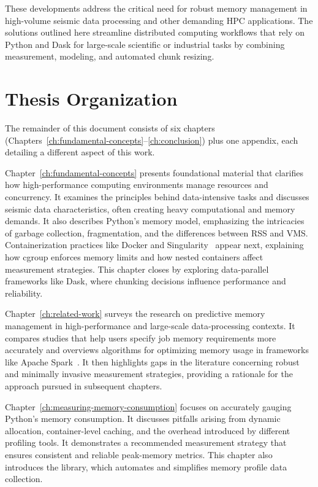 These developments address the critical need for robust memory management in high-volume seismic data processing and other demanding \ac{HPC} applications.
The solutions outlined here streamline distributed computing workflows that rely on Python and Dask for large-scale scientific or industrial tasks by combining measurement, modeling, and automated chunk resizing.


\section{Thesis Organization}
\label{sec:thesis-organization}

The remainder of this document consists of six chapters (Chapters~\ref{ch:fundamental-concepts}–\ref{ch:conclusion}) plus one appendix, each detailing a different aspect of this work.

Chapter~\ref{ch:fundamental-concepts} presents foundational material that clarifies how high-performance computing environments manage resources and concurrency.
It examines the principles behind data-intensive tasks and discusses seismic data characteristics, often creating heavy computational and memory demands.
It also describes Python's memory model, emphasizing the intricacies of garbage collection, fragmentation, and the differences between \ac{RSS} and \ac{VMS}.
Containerization practices like Docker and Singularity~\cite{singularity} appear next, explaining how \ac{cgroup} enforces memory limits and how nested containers affect measurement strategies.
This chapter closes by exploring data-parallel frameworks like Dask, where chunking decisions influence performance and reliability.

Chapter~\ref{ch:related-work} surveys the research on predictive memory management in high-performance and large-scale data-processing contexts.
It compares studies that help users specify job memory requirements more accurately and overviews algorithms for optimizing memory usage in frameworks like Apache Spark~\cite{zaharia2010spark}.
It then highlights gaps in the literature concerning robust and minimally invasive measurement strategies, providing a rationale for the approach pursued in subsequent chapters.

Chapter~\ref{ch:measuring-memory-consumption} focuses on accurately gauging Python's memory consumption.
It discusses pitfalls arising from dynamic allocation, container-level caching, and the overhead introduced by different profiling tools.
It demonstrates a recommended measurement strategy that ensures consistent and reliable peak-memory metrics.
This chapter also introduces the \traceq library, which automates and simplifies memory profile data collection.

